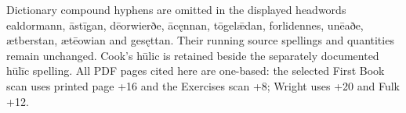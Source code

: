 Dictionary compound hyphens are omitted in the displayed headwords ealdormann, āstīgan, dēorwierðe, ācęnnan, tōgelǣdan, forlidennes, unēaðe, ætberstan, ætēowian and gesęttan. Their running source spellings and quantities remain unchanged. Cook’s hūlic is retained beside the separately documented hūlīc spelling. All PDF pages cited here are one-based: the selected First Book scan uses printed page +16 and the Exercises scan +8; Wright uses +20 and Fulk +12.

\endgroup

\par\label{end-ch08-learner}
\clearpage\endgroup
